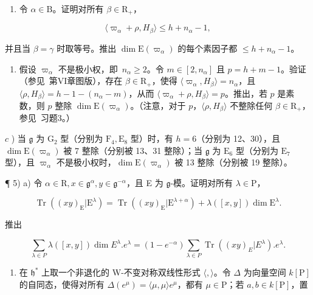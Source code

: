 \begin{enumerate}
\def\labelenumi{\alph{enumi})}
\tightlist
\item
  令 \(\alpha \in \mathrm{B}\)。证明对所有 \(\beta \in \mathrm{R}_{+}\)，
\end{enumerate}

\[
\langle \varpi_ {\alpha} + \rho , H _ {\beta} \rangle \leq h + n _ {\alpha} - 1,
\]

并且当 \(\beta = \gamma\) 时取等号。推出 \(\dim \mathrm{E}(\varpi_{\alpha})\) 的每个素因子都 \(\leq h + n_{\alpha} - 1\)。

\begin{enumerate}
\def\labelenumi{\alph{enumi})}
\setcounter{enumi}{1}
\tightlist
\item
  假设 \(\varpi_{\alpha}\) 不是极小权，即~\(n_{\alpha} \geq 2\)。令 \(m \in [2, n_{\alpha}]\) 且 \(p = h + m - 1\)。验证（参见~第VI章图版），存在 \(\beta \in \mathrm{R}_{+}\)，使得 \(\langle \varpi_{\alpha}, H_{\beta} \rangle = n_{\alpha}\)，且 \(\langle \rho, H_{\beta} \rangle = h - 1 - (n_{\alpha} - m)\)，从而 \(\langle \varpi_{\alpha} + \rho, H_{\beta} \rangle = p\)。推出，若 \(p\) 是素数，则 \(p\) 整除 \(\dim \mathrm{E}(\varpi_{\alpha})\)。（注意，对于 \(p\)，\(\langle \rho, H_{\beta} \rangle\) 不整除任何 \(\beta \in \mathrm{R}_{+}\)，参见~习题3。）
\end{enumerate}

\(c\) ) 当 \(\mathfrak{g}\) 为 \(\mathrm{G}_2\) 型（分别为 \(\mathrm{F}_4,\mathrm{E}_8\) 型）时，有 \(h = 6\)（分别为 12、30），且 \(\dim \mathrm{E}(\varpi_{\alpha})\) 被 7 整除（分别被 13、31 整除）；当 \(\mathfrak{g}\) 为 \(\mathrm{E}_6\) 型（分别为 \(\mathrm{E}_7\) 型），且 \(\varpi_{\alpha}\) 不是极小权时，\(\dim \mathrm{E}(\varpi_{\alpha})\) 被 13 整除（分别被 19 整除）。

¶ 5) a) 令 \(\alpha \in \mathrm{R}, x \in \mathfrak{g}^{\alpha}, y \in \mathfrak{g}^{-\alpha}\)，且 E 为 \(\mathfrak{g}\)-模。证明对所有 \(\lambda \in \mathrm{P}\)，

\[
\operatorname{Tr} ((x y) _ {\mathrm{E}} | \mathrm{E} ^ {\lambda}) = \operatorname{Tr} ((x y) _ {\mathrm{E}} | \mathrm{E} ^ {\lambda + \alpha}) + \lambda ([ x, y ]) \dim \mathrm{E} ^ {\lambda}.
\]

推出

\[
\sum_ {\lambda \in P} \lambda ([ x, y ]) \dim E ^ {\lambda}. e ^ {\lambda} = (1 - e ^ {- \alpha}) \sum_ {\lambda \in P} \operatorname{Tr} ((x y) _ {E} | E ^ {\lambda}). e ^ {\lambda}.
\]

\begin{enumerate}
\def\labelenumi{\alph{enumi})}
\setcounter{enumi}{1}
\tightlist
\item
  在 \(\mathfrak{h}^*\) 上取一个非退化的 W-不变对称双线性形式 \(\langle ,\rangle\)。令 \(\Delta\) 为向量空间 \(k[\mathrm{P}]\) 的自同态，使得对所有 \(\Delta(e^{\mu}) = \langle \mu ,\mu \rangle e^{\mu}\)，都有 \(\mu \in \mathrm{P}\)；若 \(a,b\in k[\mathrm{P}]\)，置
\end{enumerate}

